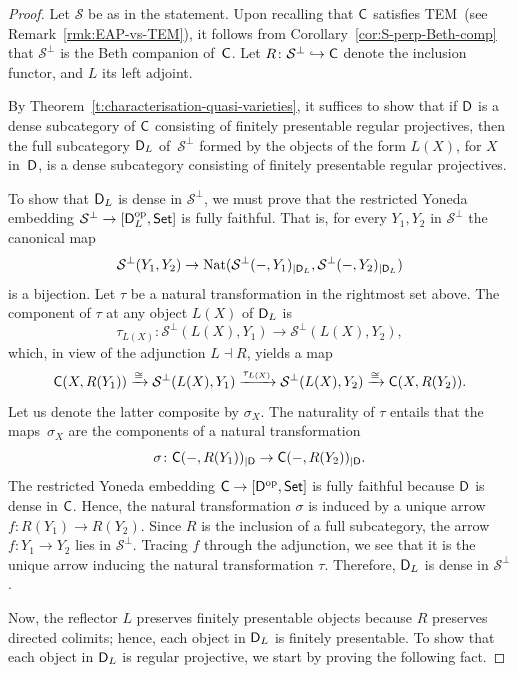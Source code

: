 \documentclass[a4paper,10pt,reqno]{amsart}
\theoremstyle{definition}
\theoremstyle{remark}
\newcommand{\cat}{{\sf C}}								%
\newcommand{\catt}{{\sf D}}								%
\newcommand{\Set}{{\sf Set}}								%
\newcommand{\ar}[1]{\mathcal{#1}}							%
\newcommand{\into}{\hookrightarrow}						%
\newcommand{\op}{{\mathrm{op}}}						%
\newcommand{\ort}[1]{{#1}^{\perp}}						%
\newcommand{\TEM}{\textnormal{TEM}}
\begin{document}
\begin{proof}
Let $\ar{S}$ be as in the statement. Upon recalling that $\cat$ satisfies \TEM~(see Remark~\ref{rmk:EAP-vs-TEM}), it follows from Corollary~\ref{cor:S-perp-Beth-comp} that $\ort{\ar{S}}$ is the Beth companion of~$\cat$. Let $R\colon \ort{\ar{S}}\into \cat$ denote the inclusion functor, and $L$ its left adjoint. 

By Theorem~\ref{t:characterisation-quasi-varieties}, it suffices to show that if $\catt$ is a dense subcategory of $\cat$ consisting of finitely presentable regular projectives, then the full subcategory $\catt_{L}$ of~$\ort{\ar{S}}$ formed by the objects of the form $L(X)$, for $X$ in~$\catt$, is a dense subcategory consisting of finitely presentable regular projectives.

To show that $\catt_{L}$ is dense in $\ort{\ar{S}}$, we must prove that the restricted Yoneda embedding $\ort{\ar{S}} \to [\catt_{L}^{\op},\Set]$ is fully faithful. That is, for every $Y_{1},Y_{2}$ in $\ort{\ar{S}}$ the canonical map
\[
\ort{\ar{S}}(Y_{1},Y_{2}) \to \mathrm{Nat}(\ort{\ar{S}}(-,Y_{1})_{\mid \catt_{L}}, \ort{\ar{S}}(-,Y_{2})_{\mid \catt_{L}})
\]
is a bijection. Let $\tau$ be a natural transformation in the rightmost set above. The component of $\tau$ at any object $L(X)$ of $\catt_{L}$ is 
\[
\tau_{L(X)}\colon \ort{\ar{S}}(L(X),Y_{1})\to \ort{\ar{S}}(L(X),Y_{2}),
\]
which, in view of the adjunction $L\dashv R$, yields a map
\[
\cat(X, R(Y_{1}))\xrightarrow{\cong} \ort{\ar{S}}(L(X),Y_{1}) \xrightarrow{\tau_{L(X)}} \ort{\ar{S}}(L(X),Y_{2}) \xrightarrow{\cong} \cat(X, R(Y_{2})).
\]
Let us denote the latter composite by $\sigma_{X}$. The naturality of $\tau$ entails that the maps~$\sigma_{X}$ are the components of a natural transformation 
\[
\sigma\colon \cat(-,R(Y_{1}))_{\mid \catt}\to \cat(-,R(Y_{2}))_{\mid \catt}.
\]
The restricted Yoneda embedding $\cat \to [\catt^{\op},\Set]$ is fully faithful because $\catt$ is dense in $\cat$. Hence, the natural transformation $\sigma$ is induced by a unique arrow $f\colon R(Y_{1})\to R(Y_{2})$. Since $R$ is the inclusion of a full subcategory, the arrow $f\colon Y_{1}\to Y_{2}$ lies in $\ort{\ar{S}}$. Tracing $f$ through the adjunction, we see that it is the unique arrow inducing the natural transformation $\tau$. Therefore, $\catt_{L}$ is dense in $\ort{\ar{S}}$.

Now, the reflector $L$ preserves finitely presentable objects because $R$ preserves directed colimits; hence, each object in $\catt_{L}$ is finitely presentable. To show that each object in $\catt_{L}$ is regular projective, we start by proving the following fact.


\end{proof}
\end{document}
